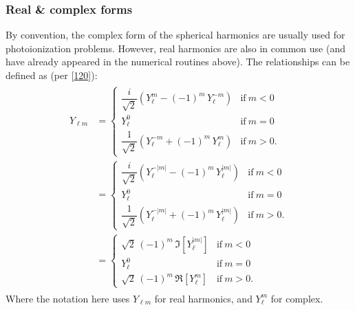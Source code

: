 \documentclass[letterpaper,table,10pt,english]{jupyterBook}
\begin{document}
\subsubsection{Real \& complex forms}
\label{\detokenize{part1/theory_observables_intro_100723:real-complex-forms}}
\sphinxAtStartPar
By convention, the complex form of the spherical harmonics are usually used for photoionization problems. However, real harmonics are also in common use (and have already appeared in the numerical routines above). The relationships can be defined as (per  {[}\hyperlink{cite.backmatter/bibliography:id960}{120}{]}):
\begin{equation}\label{equation:part1/theory_observables_intro_100723:eq:re-complex-YLM}
\begin{split}
\begin{aligned}
Y_{\ell m}&={\begin{cases}{\dfrac {i}{\sqrt {2}}}\left(Y_{\ell }^{m}-(-1)^{m}\,Y_{\ell }^{-m}\right)&{\text{if}}\ m\lt0
\\Y_{\ell }^{0}&{\text{if}}\ m=0
\\{\dfrac {1}{\sqrt {2}}}\left(Y_{\ell }^{-m}+(-1)^{m}\,Y_{\ell }^{m}\right)&{\text{if}}\ m\gt0.\end{cases}}
\\&={\begin{cases}{\dfrac {i}{\sqrt {2}}}\left(Y_{\ell }^{-|m|}-(-1)^{m}\,Y_{\ell }^{|m|}\right)&{\text{if}}\ m\lt0
\\Y_{\ell }^{0}&{\text{if}}\ m=0
\\{\dfrac {1}{\sqrt {2}}}\left(Y_{\ell }^{-|m|}+(-1)^{m}\,Y_{\ell }^{|m|}\right)&{\text{if}}\ m\gt0.\end{cases}}
\\&={\begin{cases}{\sqrt {2}}\,(-1)^{m}\,\Im [{Y_{\ell }^{|m|}}]&{\text{if}}\ m\lt0
\\Y_{\ell }^{0}&{\text{if}}\ m=0
\\{\sqrt {2}}\,(-1)^{m}\,\Re [{Y_{\ell }^{m}}]&{\text{if}}\ m\gt0.\end{cases}}
\end{aligned}
\end{split}
\end{equation}
\sphinxAtStartPar
Where the notation here uses \(Y_{\ell m}\) for real harmonics, and \(Y_{\ell }^{m}\) for complex.
\end{document}
